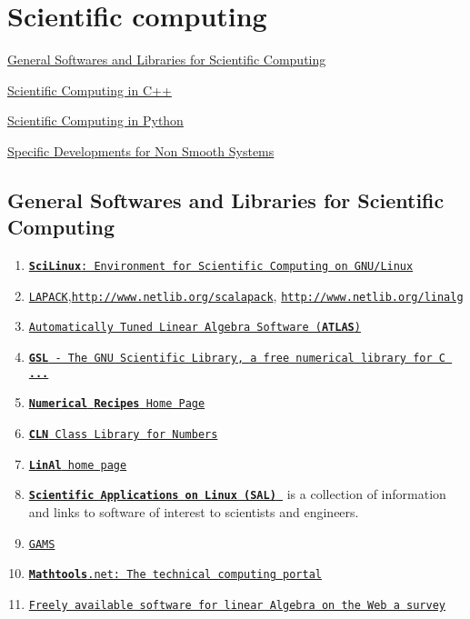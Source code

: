 \hypertarget{scientificComputing}{}\section{Scientific computing}\label{scientificComputing}
\hyperlink{scientificComputing_generalSoftwares}{General Softwares and Libraries for Scientific Computing} \par
 \hyperlink{scientificComputing_scc}{Scientific Computing in C++} \par
 \hyperlink{scientificComputing_scp}{Scientific Computing in Python} \par
 \hyperlink{scientificComputing_sdns}{Specific Developments for Non Smooth Systems} \par
\hypertarget{scientificComputing_generalSoftwares}{}\subsection{General Softwares and Libraries for Scientific Computing}\label{scientificComputing_generalSoftwares}
\begin{enumerate}
\item \href{http://scilinux.sourceforge.net/}{\tt {\bf Sci\-Linux}: Environment for Scientific Computing on GNU/Linux}\item \href{http://www.netlib.org/lapack/}{\tt LAPACK},\href{http://www.netlib.org/scalapack/}{\tt http://www.netlib.org/scalapack}, \href{http://math-atlas.sourceforge.net/}{\tt http://www.netlib.org/linalg}\item \href{http://math-atlas.sourceforge.net/}{\tt Automatically Tuned Linear Algebra Software ({\bf ATLAS})}\item \href{http://sources.redhat.com/gsl/}{\tt {\bf GSL} - The GNU Scientific Library, a free numerical library for C {\bf ...}}\item \href{http://www.nr.com/}{\tt {\bf Numerical} {\bf Recipes} Home Page}\item \href{http://www.ginac.de/CLN/}{\tt {\bf CLN} Class Library for Numbers}\item \href{http://linal.sourceforge.net/LinAl/Doc/linal.html}{\tt {\bf Lin\-Al} home page}\item \href{http://sal.kachinatech.com/}{\tt {\bf Scientific Applications on Linux (SAL)} } is a collection of information and links to software of interest to scientists and engineers.\item \href{http://www.numis.northwestern.edu/ftp/pub/list-packages.html}{\tt GAMS}\item \href{http://www.mathtools.net/}{\tt {\bf Mathtools}.net: The technical computing portal}\item \href{http://www.netlib.org/utk/people/JackDongarra/la-sw.html}{\tt Freely available software for linear Algebra on the Web a survey}\end{enumerate}
